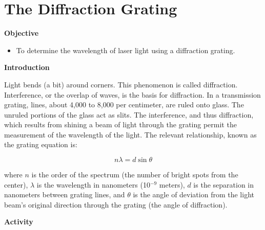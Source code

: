 
\section{The Diffraction Grating}

\makelabheader %

\textbf{Objective}

\begin{itemize}
\item To determine the wavelength of laser light using a diffraction grating.
\end{itemize}
\textbf{Introduction}

Light bends (a bit) around corners. This phenomenon is called diffraction.
Interference, or the overlap of waves, is the basis for diffraction.
In a transmission grating, lines, about 4,000 to 8,000 per centimeter,
are ruled onto glass. The unruled portions of the glass act as slits.
The interference, and thus diffraction, which results from shining
a beam of light through the grating permit the measurement of the
wavelength of the light. The relevant relationship, known as the grating
equation is:

\begin{displaymath} n\lambda = d \sin \theta \end{displaymath}

where $n$ is the order of the spectrum (the number of bright spots
from the center), $\lambda$ is the wavelength in nanometers (10\( ^{-9} \)
meters), $d$ is the separation in nanometers between grating lines,
and $\theta$ is the angle of deviation from the light beam's original
direction through the grating (the angle of diffraction).

\textbf{Activity}

